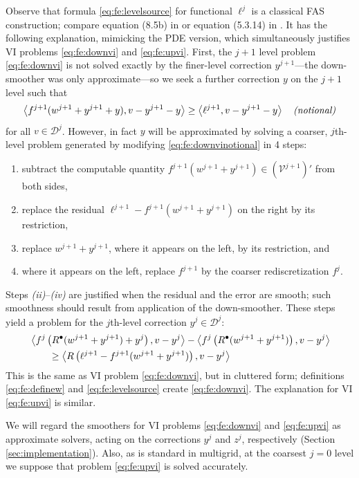 \documentclass[letterpaper,final,12pt,reqno]{amsart}
\theoremstyle{cstyle}
\theoremstyle{cstyle*}
\theoremstyle{dstyle}
\numberwithin{equation}{section}
\numberwithin{figure}{section}
\numberwithin{table}{section}
\numberwithin{theorem}{section}
\newcommand{\ip}[2]{\left<#1,#2\right>}
\newcommand{\iR}{R^{\bullet}}
\begin{document}
Observe that formula \eqref{eq:fe:levelsource} for functional $\ell^j$ is a classical FAS construction; compare equation (8.5b) in \cite{BrandtLivne2011} or equation (5.3.14) in \cite{Trottenbergetal2001}.  It has the following explanation, mimicking the PDE version, which simultaneously justifies VI problems \eqref{eq:fe:downvi} and \eqref{eq:fe:upvi}.  First, the $j+1$ level problem \eqref{eq:fe:downvi} is not solved exactly by the finer-level correction $y^{j+1}$---the down-smoother was only approximate---so we seek a further correction $y$ on the $j+1$ level such that
\begin{equation}
\ip{f^{j+1}(w^{j+1}+y^{j+1}+y)}{v-y^{j+1}-y} \ge \ip{\ell^{j+1}}{v-y^{j+1}-y} \quad \text{\emph{(notional)}} \label{eq:fe:downvinotional}
\end{equation}
for all $v\in \mathcal{D}^j$.  However, in fact $y$ will be approximated by solving a coarser, $j$th-level problem generated by modifying \eqref{eq:fe:downvinotional} in 4 steps:
\begin{enumerate}
\item subtract the computable quantity $f^{j+1}(w^{j+1}+y^{j+1}) \in (\mathcal{V}^{j+1})'$ from both sides,
\item replace the residual $\ell^{j+1}-f^{j+1}(w^{j+1}+y^{j+1})$ on the right by its restriction,
\item replace $w^{j+1}+y^{j+1}$, where it appears on the left, by its restriction, and
\item where it appears on the left, replace $f^{j+1}$ by the coarser rediscretization $f^j$.
\end{enumerate}
Steps \emph{(ii)}--\emph{(iv)} are justified when the residual and the error are smooth; such smoothness should result from application of the down-smoother.  These steps yield a problem for the $j$th-level correction $y^j \in \mathcal{D}^j$:
\begin{align}
&\ip{f^j\left(\iR(w^{j+1}+y^{j+1})+y^j\right)}{v-y^j} - \ip{f^j\left(\iR(w^{j+1}+y^{j+1})\right)}{v-y^j} \label{eq:fe:downvicluttered} \\
&\qquad \ge \ip{R\left(\ell^{j+1}-f^{j+1}(w^{j+1}+y^{j+1})\right)}{v-y^j} \notag
\end{align}
This is the same as VI problem \eqref{eq:fe:downvi}, but in cluttered form; definitions \eqref{eq:fe:definew} and \eqref{eq:fe:levelsource} create \eqref{eq:fe:downvi}.  The explanation for VI \eqref{eq:fe:upvi} is similar.

We will regard the smoothers for VI problems \eqref{eq:fe:downvi} and \eqref{eq:fe:upvi} as approximate solvers, acting on the corrections $y^j$ and $z^j$, respectively (Section \ref{sec:implementation}).  Also, as is standard in multigrid, at the coarsest $j=0$ level we suppose that problem \eqref{eq:fe:upvi} is solved accurately.
\end{document}
